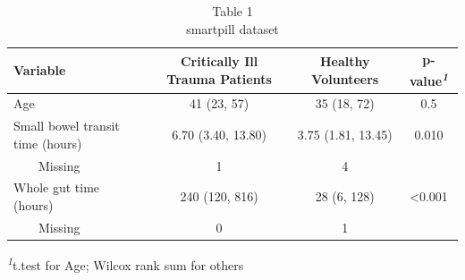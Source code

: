 \begin{table}[t]
\caption*{
{\fontsize{20}{25}\selectfont  Table 1\fontsize{12}{15}\selectfont } \\ 
{\fontsize{14}{17}\selectfont  smartpill dataset\fontsize{12}{15}\selectfont }
} 
\fontsize{12.0pt}{14.0pt}\selectfont
\begin{tabular*}{\linewidth}{@{\extracolsep{\fill}}lccc}
\toprule
\textbf{Variable} & \textbf{Critically Ill Trauma Patients} & \textbf{Healthy Volunteers} & \textbf{p-value}\textsuperscript{\textit{1}} \\ 
\midrule\addlinespace[2.5pt]
Age & 41 (23, 57) & 35 (18, 72) & 0.5 \\ 
Small bowel transit time (hours) & 6.70 (3.40, 13.80) & 3.75 (1.81, 13.45) & 0.010 \\ 
    Missing & 1 & 4 &  \\ 
Whole gut time (hours) & 240 (120, 816) & 28 (6, 128) & <0.001 \\ 
    Missing & 0 & 1 &  \\ 
\bottomrule
\end{tabular*}
\begin{minipage}{\linewidth}
\vspace{.05em}
\textsuperscript{\textit{1}}t.test for Age; Wilcox rank sum for others\\
\end{minipage}
\end{table}

